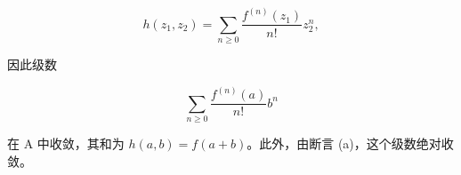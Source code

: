 \[
h (z _ {1}, z _ {2}) = \sum_ {n \geqslant 0} \frac {f ^ {(n)} (z _ {1})}{n !} z _ {2} ^ {n},
\]

因此级数

\[
\sum_ {n \geqslant 0} \frac {f ^ {(n)} (a)}{n !} b ^ {n}
\]

在 A 中收敛，其和为 \(h(a,b)=f(a+b)\)。此外，由断言 (a)，这个级数绝对收敛。

